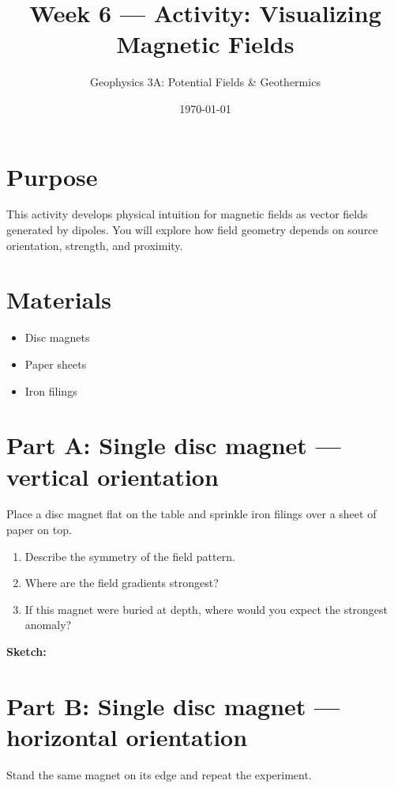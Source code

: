 \documentclass[11pt,a4paper]{article}
\title{Week 6 --- Activity: Visualizing Magnetic Fields}
\author{Geophysics 3A: Potential Fields \& Geothermics}
\date{\today}
\begin{document}
\maketitle

\section*{Purpose}

This activity develops physical intuition for magnetic fields as vector fields generated by dipoles. You will explore how field geometry depends on source orientation, strength, and proximity.

\section*{Materials}
\begin{itemize}
  \item Disc magnets
  \item Paper sheets
  \item Iron filings
\end{itemize}

\section*{Part A: Single disc magnet --- vertical orientation}

Place a disc magnet flat on the table and sprinkle iron filings over a sheet of paper on top.

\begin{enumerate}
  \item Describe the symmetry of the field pattern.
  \item Where are the field gradients strongest?
  \item If this magnet were buried at depth, where would you expect the strongest anomaly?
\end{enumerate}

\vspace{3cm}
\noindent\textbf{Sketch:}

\vspace{4cm}

\section*{Part B: Single disc magnet --- horizontal orientation}

Stand the same magnet on its edge and repeat the experiment.
\end{document}
